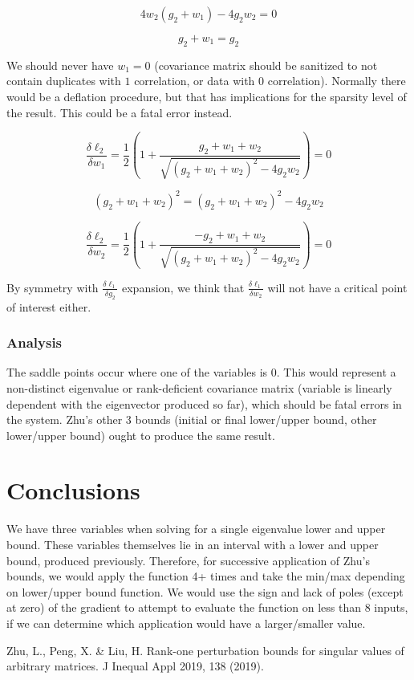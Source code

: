 \documentclass{article}
\begin{document}
$$
4w_2(g_2 + w_1) - 4g_2w_2 = 0
$$

$$
g_2 + w_1 = g_2
$$

We should never have $w_1 = 0$ (covariance matrix should be sanitized to not contain duplicates with $1$ correlation, or data with $0$ correlation). Normally there would be a deflation procedure, but that has implications for the sparsity level of the result. This could be a fatal error instead.

$$
\frac{\delta \ell_2}{\delta w_1}
=
\frac{1}{2} \left( 1 + \frac{g_2 + w_1 + w_2}{\sqrt{(g_2 + w_1 + w_2)^2 - 4g_2 w_2}} \right)
= 0
$$

$$
(g_2 + w_1 + w_2)^2 = (g_2 + w_1 + w_2)^2 - 4g_2w_2
$$

$$
\frac{\delta \ell_2}{\delta w_2}
=
\frac{1}{2} \left( 1 + \frac{-g_2 + w_1 + w_2}{\sqrt{(g_2 + w_1 + w_2)^2 - 4g_2 w_2}} \right)
= 0
$$

By symmetry with $\frac{\delta \ell_1}{\delta g_2}$ expansion, we think that $\frac{\delta \ell_1}{\delta w_2}$ will not have a critical point of interest either.

\subsubsection{Analysis}

The saddle points occur where one of the variables is 0. This would represent a non-distinct eigenvalue or rank-deficient covariance matrix (variable is linearly dependent with the eigenvector produced so far), which should be fatal errors in the system. Zhu's other 3 bounds (initial or final lower/upper bound, other lower/upper bound) ought to produce the same result.

\section{Conclusions}

We have three variables when solving for a single eigenvalue lower and upper bound. These variables themselves lie in an interval with a lower and upper bound, produced previously. Therefore, for successive application of Zhu's bounds, we would apply the function 4+ times and take the min/max depending on lower/upper bound function. We would use the sign and lack of poles (except at zero) of the gradient to attempt to evaluate the function on less than 8 inputs, if we can determine which application would have a larger/smaller value.

\begin{thebibliography}{9}
     Zhu, L., Peng, X. \& Liu, H. Rank-one perturbation bounds for singular values of arbitrary matrices. J Inequal Appl 2019, 138 (2019).
\end{thebibliography}
\end{document}
